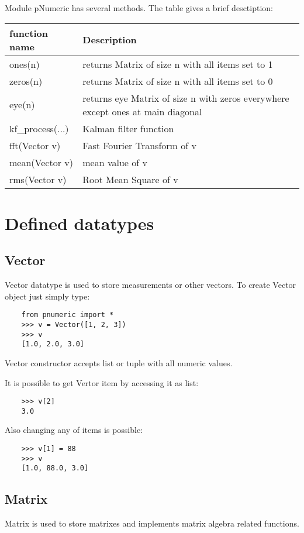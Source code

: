 \documentclass{article}
\begin{document}
    Module pNumeric has several methods. The table gives a brief desctiption:
    
    \begin{tabular}{|l|l|} \hline
    \textbf{function name} & \textbf{Description} \\ \hline
    ones(n)      & returns Matrix of size n with all items set to 1 \\
    zeros(n)     & returns Matrix of size n with all items set to 0 \\
    eye(n)       & returns eye Matrix of size n with zeros everywhere except ones at main diagonal \\
    kf_process(...)  & Kalman filter function \\
    fft(Vector v)       & Fast Fourier Transform of v \\
    mean(Vector v)       & mean value of v \\
    rms(Vector v)       & Root Mean Square of v \\
    \end{tabular}


\section{Defined datatypes \label{datatypes}}
  
  \subsection{Vector \label{Vector}}
    Vector datatype is used to store measurements or other vectors. To create 
    Vector object just simply type:
    \begin{verbatim}
    from pnumeric import *
    >>> v = Vector([1, 2, 3])
    >>> v
    [1.0, 2.0, 3.0]
    \end{verbatim}
    
    Vector constructor accepts list or tuple with all numeric values.

    It is possible to get Vertor item by accessing it as list:
    
    \begin{verbatim}
    >>> v[2]
    3.0
    \end{verbatim}
    
    Also changing any of items is possible:
    \begin{verbatim}
    >>> v[1] = 88
    >>> v
    [1.0, 88.0, 3.0]
    \end{verbatim}
  
  \subsection{Matrix \label{Matrix}}
    Matrix is used to store matrixes and implements matrix algebra related
    functions.
    
\end{document}

